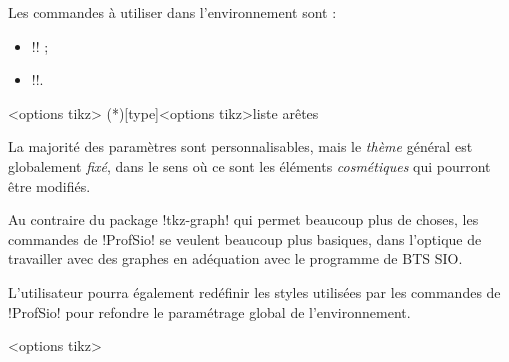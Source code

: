 \documentclass[french,a4paper,11pt]{article}
\begin{document}
{{\begin{cautionblock}
\smallskip

Les commandes à utiliser dans l'environnement sont :

\begin{itemize}
	\item \motcletex!\GrphPlaceSommets! ;
	\item \motcletex!\GrphTraceAretes!.
\end{itemize}
\vspace*{-\baselineskip}\leavevmode
\end{cautionblock}

\begin{DemoCode}
\begin{GrapheTikz}[clés]<options tikz>
	\GrphTraceAretes(*)[type]<options tikz>{liste arêtes}
\end{GrapheTikz}
\end{DemoCode}

\begin{DemoCode}[]
\begin{GrapheTikz}
\end{GrapheTikz}
\end{DemoCode}

\begin{warningblock}
La majorité des paramètres sont personnalisables, mais le \textit{thème} général est globalement \textit{fixé}, dans le sens où ce sont les éléments \textit{cosmétiques} qui pourront être modifiés.

\smallskip

Au contraire du package \packagetex!tkz-graph! qui permet beaucoup plus de choses, les commandes de \packagetex!ProfSio! se veulent beaucoup plus basiques, dans l'optique de travailler avec des graphes en adéquation avec le programme de BTS SIO.
\end{warningblock}

\begin{noteblock}
L'utilisateur pourra également redéfinir les styles utilisées par les commandes de \packagetex!ProfSio! pour refondre le paramétrage global de l'environnement.
\end{noteblock}

\begin{DemoCode}
\begin{GrapheTikz}[clés]<options tikz>
\end{GrapheTikz}
\end{DemoCode}

}}
\end{document}
